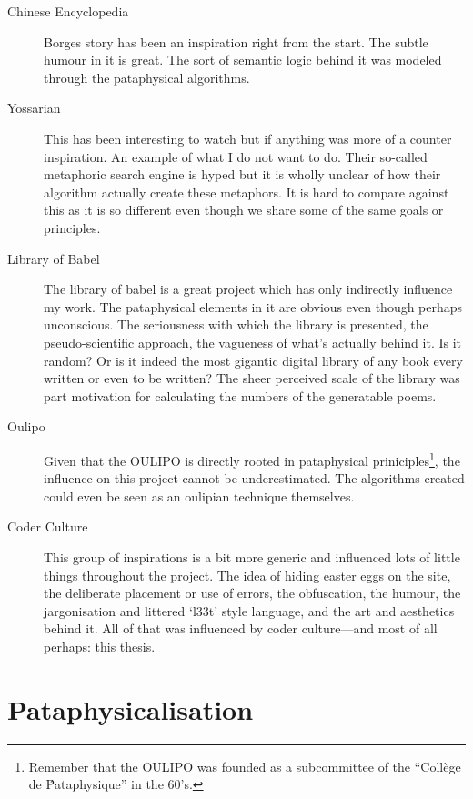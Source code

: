 \begin{description}
  \item[Chinese Encyclopedia] Borges story has been an inspiration right from the start. The subtle humour in it is great. The sort of semantic logic behind it was modeled through the pataphysical algorithms.
  \item[Yossarian] This has been interesting to watch but if anything was more of a counter inspiration. An example of what I do not want to do. Their so-called metaphoric search engine is hyped but it is wholly unclear of how their algorithm actually create these metaphors. It is hard to compare against this as it is so different even though we share some of the same goals or principles.
  \item[Library of Babel] The library of babel is a great project which has only indirectly influence my work. The pataphysical elements in it are obvious even though perhaps unconscious. The seriousness with which the library is presented, the pseudo-scientific approach, the vagueness of what's actually behind it. Is it random? Or is it indeed the most gigantic digital library of any book every written or even to be written? The sheer perceived scale of the library was part motivation for calculating the numbers of the generatable poems.
  \item[Oulipo] Given that the \ac{OULIPO} is directly rooted in pataphysical priniciples\footnote{Remember that the \ac{OULIPO} was founded as a subcommittee of the ``Coll\`{e}ge de \'Pataphysique'' in the 60's.}, the influence on this project cannot be underestimated. The algorithms created could even be seen as an oulipian technique themselves.
  \item[Coder Culture] This group of inspirations is a bit more generic and influenced lots of little things throughout the project. The idea of hiding easter eggs on the site, the deliberate placement or use of errors, the obfuscation, the humour, the jargonisation and littered `l33t' style language, and the art and aesthetics behind it. All of that was influenced by coder culture---and most of all perhaps: this thesis.
\end{description}


\section{Pataphysicalisation}

